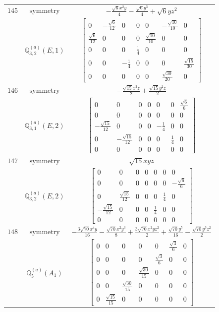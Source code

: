 \documentclass[fleqn,8pt,landscape]{jsarticle}
\begin{document}
\begin{longtable}{ccc}
$ 145 $ & $ \text{symmetry} $ & $ - \frac{\sqrt{6} x^{2} y}{4} - \frac{\sqrt{6} y^{3}}{4} + \sqrt{6} y z^{2} $ \\
$  $ & $ \mathbb{Q}_{3,2}^{(a)}(E,1) $ & $ \begin{bmatrix} 0 & - \frac{\sqrt{6}}{12} & 0 & 0 & 0 & - \frac{\sqrt{10}}{10} & 0 \\ \frac{\sqrt{6}}{12} & 0 & 0 & 0 & \frac{\sqrt{10}}{10} & 0 & 0 \\ 0 & 0 & 0 & \frac{1}{4} & 0 & 0 & 0 \\ 0 & 0 & - \frac{1}{4} & 0 & 0 & 0 & \frac{\sqrt{15}}{30} \\ 0 & 0 & 0 & 0 & 0 & \frac{\sqrt{30}}{20} & 0 \end{bmatrix} $ \\ \hline
$ 146 $ & $ \text{symmetry} $ & $ - \frac{\sqrt{15} x^{2} z}{2} + \frac{\sqrt{15} y^{2} z}{2} $ \\
$  $ & $ \mathbb{Q}_{3,1}^{(a)}(E,2) $ & $ \begin{bmatrix} 0 & 0 & 0 & 0 & 0 & 0 & \frac{\sqrt{6}}{6} \\ 0 & 0 & 0 & 0 & 0 & 0 & 0 \\ - \frac{\sqrt{15}}{12} & 0 & 0 & 0 & - \frac{1}{4} & 0 & 0 \\ 0 & - \frac{\sqrt{15}}{12} & 0 & 0 & 0 & \frac{1}{4} & 0 \\ 0 & 0 & 0 & 0 & 0 & 0 & 0 \end{bmatrix} $ \\ \hline
$ 147 $ & $ \text{symmetry} $ & $ \sqrt{15} x y z $ \\
$  $ & $ \mathbb{Q}_{3,2}^{(a)}(E,2) $ & $ \begin{bmatrix} 0 & 0 & 0 & 0 & 0 & 0 & 0 \\ 0 & 0 & 0 & 0 & 0 & 0 & - \frac{\sqrt{6}}{6} \\ 0 & \frac{\sqrt{15}}{12} & 0 & 0 & 0 & \frac{1}{4} & 0 \\ - \frac{\sqrt{15}}{12} & 0 & 0 & 0 & \frac{1}{4} & 0 & 0 \\ 0 & 0 & 0 & 0 & 0 & 0 & 0 \end{bmatrix} $ \\ \hline
$ 148 $ & $ \text{symmetry} $ & $ - \frac{3 \sqrt{70} x^{4} y}{16} - \frac{\sqrt{70} x^{2} y^{3}}{8} + \frac{3 \sqrt{70} x^{2} y z^{2}}{2} + \frac{\sqrt{70} y^{5}}{16} - \frac{\sqrt{70} y^{3} z^{2}}{2} $ \\
$  $ & $ \mathbb{Q}_{5}^{(a)}(A_{1}) $ & $ \begin{bmatrix} 0 & 0 & 0 & 0 & 0 & \frac{\sqrt{3}}{6} & 0 \\ 0 & 0 & 0 & 0 & \frac{\sqrt{3}}{6} & 0 & 0 \\ 0 & 0 & 0 & \frac{\sqrt{30}}{15} & 0 & 0 & 0 \\ 0 & 0 & \frac{\sqrt{30}}{15} & 0 & 0 & 0 & 0 \\ 0 & \frac{\sqrt{15}}{15} & 0 & 0 & 0 & 0 & 0 \end{bmatrix} $ \\ \hline

\end{longtable}
\end{document}
